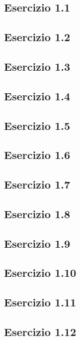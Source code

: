 \subsection{\textbf{Esercizio 1.1}}

\subsection{\textbf{Esercizio 1.2}}

\subsection{\textbf{Esercizio 1.3}}

\subsection{\textbf{Esercizio 1.4}}

\subsection{\textbf{Esercizio 1.5}}

\subsection{\textbf{Esercizio 1.6}}

\subsection{\textbf{Esercizio 1.7}}

\subsection{\textbf{Esercizio 1.8}}

\subsection{\textbf{Esercizio 1.9}}

\subsection{\textbf{Esercizio 1.10}}

\subsection{\textbf{Esercizio 1.11}}

\subsection{\textbf{Esercizio 1.12}}

